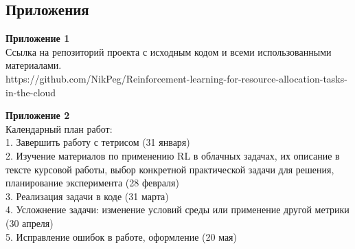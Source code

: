 \documentclass{article}
\newcommand\zz[1]{\par{\normalsize\strut #1} \hfill\ignorespaces}
\begin{document}
\newpage
\begin{center}
\section {Приложения}
\end{center}
\zz{}\textbf{Приложение 1\\}
Ссылка на репозиторий проекта с исходным кодом и всеми использованными материалами.\\
https://github.com/NikPeg/Reinforcement-learning-for-resource-allocation-tasks-in-the-cloud
\zz{}\textbf{Приложение 2\\}
Календарный план работ:\\
1. Завершить работу с тетрисом (31 января)\\
2. Изучение материалов по применению RL в облачных задачах, их описание в тексте курсовой работы, выбор конкретной практической задачи для решения, планирование эксперимента (28 февраля)\\
3. Реализация задачи в коде (31 марта)\\
4. Усложнение задачи: изменение условий среды или применение другой метрики (30 апреля)\\
5. Исправление ошибок в работе, оформление (20 мая)\\
\end{document}

